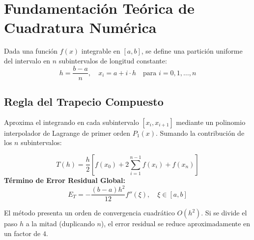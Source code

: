 \documentclass[11pt,a4paper]{article}
\begin{document}
\section{Fundamentación Teórica de Cuadratura Numérica}

Dada una función $f(x)$ integrable en $[a, b]$, se define una partición uniforme del intervalo en $n$ subintervalos de longitud constante:
\begin{equation}
h = \frac{b - a}{n}, \quad x_i = a + i \cdot h \quad \text{para } i = 0, 1, \dots, n
\end{equation}

\subsection{Regla del Trapecio Compuesto}
Aproxima el integrando en cada subintervalo $[x_i, x_{i+1}]$ mediante un polinomio interpolador de Lagrange de primer orden $P_1(x)$. Sumando la contribución de los $n$ subintervalos:
\begin{formulabox}[title=Fórmula del Trapecio Compuesto]
\begin{equation}
T(h) = \frac{h}{2} \left[ f(x_0) + 2 \sum_{i=1}^{n-1} f(x_i) + f(x_n) \right]
\end{equation}
\textbf{Término de Error Residual Global:}
\begin{equation}
E_T = -\frac{(b - a) h^2}{12} f''(\xi), \quad \xi \in [a, b]
\end{equation}
\end{formulabox}
El método presenta un orden de convergencia cuadrático $O(h^2)$. Si se divide el paso $h$ a la mitad (duplicando $n$), el error residual se reduce aproximadamente en un factor de $4$.
\end{document}
